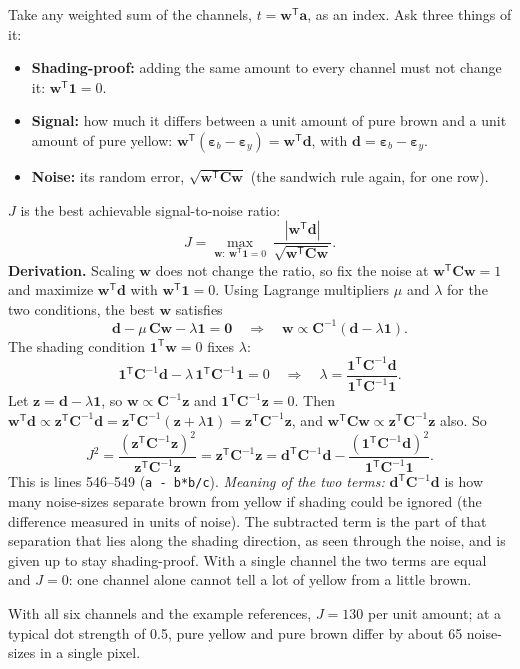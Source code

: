 \documentclass[11pt,letterpaper]{article}
\newcommand{\code}[1]{\texttt{#1}}
\newcommand{\va}{\mathbf{a}}
\newcommand{\vd}{\mathbf{d}}
\newcommand{\vw}{\mathbf{w}}
\newcommand{\vz}{\mathbf{z}}
\newcommand{\vone}{\mathbf{1}}
\newcommand{\epsy}{\bm{\varepsilon}_y}
\newcommand{\epsb}{\bm{\varepsilon}_b}
\newcommand{\mC}{\mathbf{C}}
\newcommand{\T}{^{\mathsf{T}}}
\newcommand{\inv}{^{-1}}
\begin{document}
Take any weighted sum of the channels, $t = \vw\T\va$, as an index.  Ask
three things of it:
\begin{itemize}[nosep]
\item \textbf{Shading-proof:} adding the same amount to every channel must
  not change it: $\vw\T\vone = 0$.
\item \textbf{Signal:} how much it differs between a unit amount of pure
  brown and a unit amount of pure yellow: $\vw\T(\epsb - \epsy) = \vw\T\vd$,
  with $\vd = \epsb - \epsy$.
\item \textbf{Noise:} its random error, $\sqrt{\vw\T\mC\vw}$ (the sandwich
  rule again, for one row).
\end{itemize}
$J$ is the best achievable signal-to-noise ratio:
\[
J = \max_{\vw:\ \vw\T\vone = 0}\ \frac{|\vw\T\vd|}{\sqrt{\vw\T\mC\vw}} .
\]
\textbf{Derivation.}  Scaling $\vw$ does not change the ratio, so fix the
noise at $\vw\T\mC\vw = 1$ and maximize $\vw\T\vd$ with $\vw\T\vone = 0$.
Using Lagrange multipliers $\mu$ and $\lambda$ for the two conditions, the
best $\vw$ satisfies
\[
\vd - \mu\,\mC\vw - \lambda\vone = \mathbf 0
\quad\Longrightarrow\quad
\vw \propto \mC\inv(\vd - \lambda\vone) .
\]
The shading condition $\vone\T\vw = 0$ fixes $\lambda$:
\[
\vone\T\mC\inv\vd - \lambda\,\vone\T\mC\inv\vone = 0
\quad\Longrightarrow\quad
\lambda = \frac{\vone\T\mC\inv\vd}{\vone\T\mC\inv\vone} .
\]
Let $\vz = \vd - \lambda\vone$, so $\vw \propto \mC\inv\vz$ and $\vone\T
\mC\inv\vz = 0$.  Then $\vw\T\vd \propto \vz\T\mC\inv\vd = \vz\T\mC\inv(\vz +
\lambda\vone) = \vz\T\mC\inv\vz$, and $\vw\T\mC\vw \propto \vz\T\mC\inv\vz$
also.  So
\begin{equation}
J^2 = \frac{(\vz\T\mC\inv\vz)^2}{\vz\T\mC\inv\vz} = \vz\T\mC\inv\vz
= \vd\T\mC\inv\vd - \frac{(\vone\T\mC\inv\vd)^2}{\vone\T\mC\inv\vone} .
\label{eq:jhue}
\end{equation}
This is lines 546--549 (\code{a - b*b/c}).  \emph{Meaning of the two terms:}
$\vd\T\mC\inv\vd$ is how many noise-sizes separate brown from yellow if
shading could be ignored (the difference measured in units of noise).  The
subtracted term is the part of that separation that lies along the shading
direction, as seen through the noise, and is given up to stay shading-proof.
With a single channel the two terms are equal and $J = 0$: one channel alone
cannot tell a lot of yellow from a little brown.

With all six channels and the example references, $J = 130$ per unit amount;
at a typical dot strength of 0.5, pure yellow and pure brown differ by about
65 noise-sizes in a single pixel.
\end{document}
